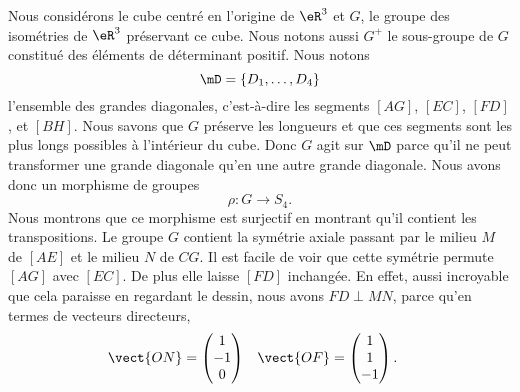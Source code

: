 \begin{wrapfigure}{r}{6.0cm}
   \vspace{-0.5cm}        %
   \centering
   
\end{wrapfigure}
Nous considérons le cube centré en l'origine de \( \eR^3\) et \( G\), le groupe des isométries de \( \eR^3\) préservant ce cube. Nous notons aussi \( G^+\) le sous-groupe de \( G\) constitué des éléments de déterminant positif. Nous notons
\begin{equation}
    \mD=\{ D_1,\ldots, D_4 \}
\end{equation}
l'ensemble des grandes diagonales, c'est-à-dire les segments \( [AG]\), \( [EC]\), \( [FD]\), et \( [BH]\). Nous savons que \( G\) préserve les longueurs et que ces segments sont les plus longs possibles à l'intérieur du cube. Donc \( G\) agit sur \( \mD\) parce qu'il ne peut transformer une grande diagonale qu'en une autre grande diagonale. Nous avons donc un morphisme de groupes
\begin{equation}
    \rho\colon G\to S_4.
\end{equation}
Nous montrons que ce morphisme est surjectif en montrant qu'il contient les transpositions. Le groupe \( G\) contient la symétrie axiale passant par le milieu \( M\) de \( [AE]\) et le milieu \( N\) de \( CG\). Il est facile de voir que cette symétrie permute \( [AG]\) avec \( [EC]\). De plus elle laisse \( [FD]\) inchangée. En effet, aussi incroyable que cela paraisse en regardant le dessin, nous avons \( FD\perp MN\), parce qu'en termes de vecteurs directeurs,
\begin{equation}
    \begin{aligned}[]
        \vect{ ON }&=\begin{pmatrix}
            1    \\
            -1    \\
            0
        \end{pmatrix}&\vect{ OF }&=\begin{pmatrix}
            1    \\
            1    \\
            -1
        \end{pmatrix}.
    \end{aligned}
\end{equation}

